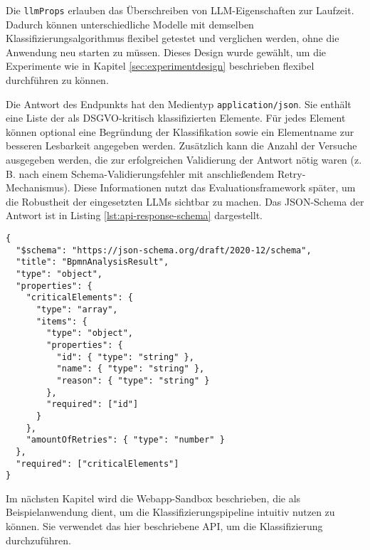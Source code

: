 Die \texttt{llmProps} erlauben das Überschreiben von \ac{LLM}-Eigenschaften zur Laufzeit. Dadurch können unterschiedliche Modelle mit demselben Klassifizierungsalgorithmus flexibel getestet und verglichen werden, ohne die Anwendung neu starten zu müssen. Dieses Design wurde gewählt, um die Experimente wie in Kapitel \ref{sec:experimentdesign} beschrieben flexibel durchführen zu können.

Die Antwort des Endpunkts hat den Medientyp \texttt{application/json}. Sie enthält eine Liste der als \ac{DSGVO}-kritisch klassifizierten Elemente. Für jedes Element können optional eine Begründung der Klassifikation sowie ein Elementname zur besseren Lesbarkeit angegeben werden. Zusätzlich kann die Anzahl der Versuche ausgegeben werden, die zur erfolgreichen Validierung der Antwort nötig waren (z.\,B. nach einem Schema-Validierungsfehler mit anschließendem Retry-Mechanismus). Diese Informationen nutzt das Evaluationsframework später, um die Robustheit der eingesetzten \acp{LLM} sichtbar zu machen. Das JSON-Schema der Antwort ist in Listing \ref{lst:api-response-schema} dargestellt.

\begin{lstlisting}[caption={JSON-Schema der API-Antwort.},label={lst:api-response-schema}]
{
  "$schema": "https://json-schema.org/draft/2020-12/schema",
  "title": "BpmnAnalysisResult",
  "type": "object",
  "properties": {
    "criticalElements": {
      "type": "array",
      "items": {
        "type": "object",
        "properties": {
          "id": { "type": "string" },
          "name": { "type": "string" },
          "reason": { "type": "string" }
        },
        "required": ["id"]
      }
    },
    "amountOfRetries": { "type": "number" }
  },
  "required": ["criticalElements"]
}
\end{lstlisting}

Im nächsten Kapitel wird die Webapp-Sandbox beschrieben, die als Beispielanwendung dient, um die Klassifizierungspipeline intuitiv nutzen zu können. Sie verwendet das hier beschriebene API, um die Klassifizierung durchzuführen.